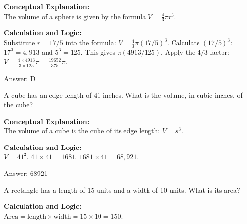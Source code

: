 \documentclass[11pt,paper=a4,answers]{exam}
\begin{document}
\begin{questions}
\begin{solution}
\textbf{Conceptual Explanation:} \\
The volume of a sphere is given by the formula $V = \frac{4}{3}\pi r^3$.

\vspace{30pt}

\textbf{Calculation and Logic:} \\
Substitute $r = 17/5$ into the formula: $V = \frac{4}{3}\pi (17/5)^3$. Calculate $(17/5)^3$: $17^3 = 4,913$ and $5^3 = 125$. This gives $\pi(4913/125)$. Apply the $4/3$ factor: $V = \frac{4 \times 4913}{3 \times 125}\pi = \frac{19652}{375}\pi$.

\vspace{30pt}

Answer: \colorbox{yellow!100}{D}
\end{solution}

\vspace{60pt}

\question
A cube has an edge length of 41 inches. What is the volume, in cubic inches, of the cube?

\begin{solution}
\textbf{Conceptual Explanation:} \\
The volume of a cube is the cube of its edge length: $V = s^3$.

\vspace{30pt}

\textbf{Calculation and Logic:} \\
$V = 41^3$. $41 \times 41 = 1681$. $1681 \times 41 = 68,921$.

\vspace{30pt}

Answer: \colorbox{yellow!100}{68921}
\end{solution}

\vspace{60pt}

\question
A rectangle has a length of 15 units and a width of 10 units. What is its area?

\begin{solution}
\textbf{Calculation and Logic:} \\
$\text{Area} = \text{length} \times \text{width} = 15 \times 10 = 150$.

\vspace{30pt}


\end{solution}
\end{questions}
\end{document}
